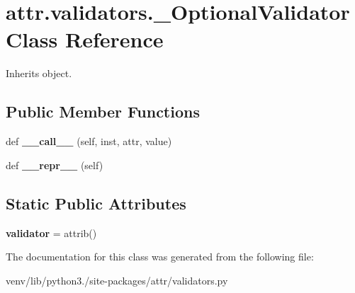 \hypertarget{classattr_1_1validators_1_1___optional_validator}{}\section{attr.\+validators.\+\_\+\+Optional\+Validator Class Reference}
\label{classattr_1_1validators_1_1___optional_validator}


Inherits object.

\subsection*{Public Member Functions}
\begin{DoxyCompactItemize}
\item 
\mbox{\label{classattr_1_1validators_1_1___optional_validator_a37005a3bae831542debcdd536c6974b7}} 
def {\bfseries \+\_\+\+\_\+call\+\_\+\+\_\+} (self, inst, attr, value)
\item 
\mbox{\label{classattr_1_1validators_1_1___optional_validator_a372224cd185bf45acd70c9ffc5624b25}} 
def {\bfseries \+\_\+\+\_\+repr\+\_\+\+\_\+} (self)
\end{DoxyCompactItemize}
\subsection*{Static Public Attributes}
\begin{DoxyCompactItemize}
\item 
\mbox{\label{classattr_1_1validators_1_1___optional_validator_ae35b035c367f5e4c154c46b3e54fcb43}} 
{\bfseries validator} = attrib()
\end{DoxyCompactItemize}


The documentation for this class was generated from the following file\+:\begin{DoxyCompactItemize}
\item 
venv/lib/python3./site-\/packages/attr/validators.\+py\end{DoxyCompactItemize}
